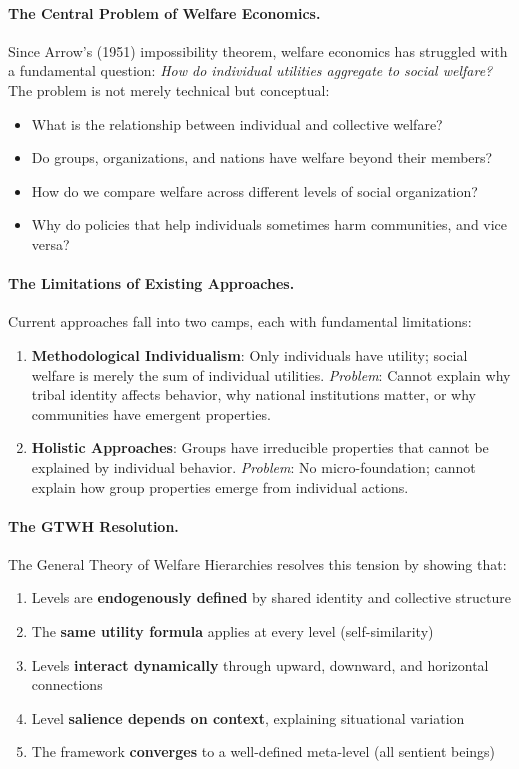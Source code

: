 \paragraph{The Central Problem of Welfare Economics.}
Since Arrow's (1951) impossibility theorem, welfare economics has struggled 
with a fundamental question: \textit{How do individual utilities aggregate to 
social welfare?} The problem is not merely technical but conceptual:

\begin{itemize}
\item What is the relationship between individual and collective welfare?
\item Do groups, organizations, and nations have welfare beyond their members?
\item How do we compare welfare across different levels of social organization?
\item Why do policies that help individuals sometimes harm communities, and vice versa?
\end{itemize}

\paragraph{The Limitations of Existing Approaches.}
Current approaches fall into two camps, each with fundamental limitations:

\begin{enumerate}
\item \textbf{Methodological Individualism}: Only individuals have utility; 
social welfare is merely the sum of individual utilities. 
\textit{Problem}: Cannot explain why tribal identity affects behavior, 
why national institutions matter, or why communities have emergent properties.

\item \textbf{Holistic Approaches}: Groups have irreducible properties that 
cannot be explained by individual behavior.
\textit{Problem}: No micro-foundation; cannot explain how group properties 
emerge from individual actions.
\end{enumerate}

\paragraph{The GTWH Resolution.}
The General Theory of Welfare Hierarchies resolves this tension by showing that:
\begin{enumerate}
\item Levels are \textbf{endogenously defined} by shared identity and collective structure
\item The \textbf{same utility formula} applies at every level (self-similarity)
\item Levels \textbf{interact dynamically} through upward, downward, and horizontal connections
\item Level \textbf{salience depends on context}, explaining situational variation
\item The framework \textbf{converges} to a well-defined meta-level (all sentient beings)
\end{enumerate}

